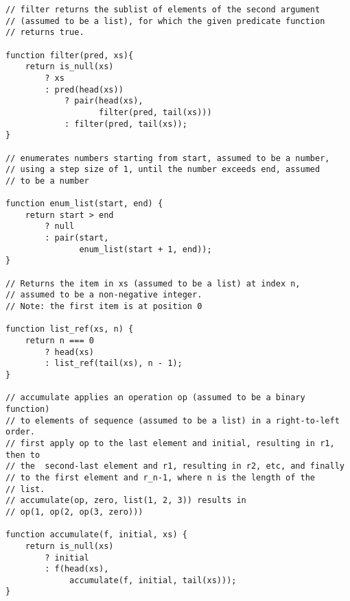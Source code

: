 \begin{lstlisting}
// filter returns the sublist of elements of the second argument
// (assumed to be a list), for which the given predicate function
// returns true.

function filter(pred, xs){
    return is_null(xs)
        ? xs
        : pred(head(xs))
            ? pair(head(xs),
                   filter(pred, tail(xs)))
            : filter(pred, tail(xs));
}

// enumerates numbers starting from start, assumed to be a number,
// using a step size of 1, until the number exceeds end, assumed
// to be a number

function enum_list(start, end) {
    return start > end
        ? null
        : pair(start,
               enum_list(start + 1, end));
}

// Returns the item in xs (assumed to be a list) at index n,
// assumed to be a non-negative integer.
// Note: the first item is at position 0

function list_ref(xs, n) {
    return n === 0
        ? head(xs)
        : list_ref(tail(xs), n - 1);
}

// accumulate applies an operation op (assumed to be a binary function)
// to elements of sequence (assumed to be a list) in a right-to-left order.
// first apply op to the last element and initial, resulting in r1, then to
// the  second-last element and r1, resulting in r2, etc, and finally
// to the first element and r_n-1, where n is the length of the
// list.
// accumulate(op, zero, list(1, 2, 3)) results in
// op(1, op(2, op(3, zero)))

function accumulate(f, initial, xs) {
    return is_null(xs)
        ? initial
        : f(head(xs),
             accumulate(f, initial, tail(xs)));
}
\end{lstlisting}



